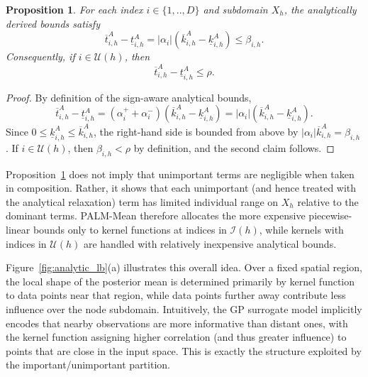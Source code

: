 \documentclass[pdflatex,sn-mathphys-num]{sn-jnl}%
\theoremstyle{thmstyleone}%
\newtheorem{proposition}[theorem]{Proposition}%
\theoremstyle{thmstyletwo}%
\theoremstyle{thmstylethree}%
\begin{document}
\begin{proposition}
\label{prop:analytic_gap_beta}
For each index $i \in \{1,..,D\}$ and subdomain $X_h$, the analytically derived bounds satisfy
\[
\overline{t}_{i,h}^{A}-\underline{t}_{i,h}^{A}
=
|\alpha_i|\left(\overline{k}_{i,h}^{A}-\underline{k}_{i,h}^{A}\right)
\le \beta_{i,h}.
\]
Consequently, if $i\in\mathcal{U}(h)$, then
\[
\overline{t}_{i,h}^{A}-\underline{t}_{i,h}^{A}
\le \rho.
\]
\end{proposition}

\begin{proof}
By definition of the sign-aware analytical bounds,
\[
\overline{t}_{i,h}^{A}-\underline{t}_{i,h}^{A}
=
(\alpha_i^++\alpha_i^-)\left(\overline{k}_{i,h}^{A}-\underline{k}_{i,h}^{A}\right)
=
|\alpha_i|\left(\overline{k}_{i,h}^{A}-\underline{k}_{i,h}^{A}\right).
\]
Since $0\le \underline{k}_{i,h}^{A}\le \overline{k}_{i,h}^{A}$, the right-hand side is bounded from above by $|\alpha_i|\overline{k}_{i,h}^{A}=\beta_{i,h}$. If $i\in\mathcal{U}(h)$, then $\beta_{i,h}<\rho$ by definition, and the second claim follows.
\end{proof}

Proposition~\ref{prop:analytic_gap_beta} does not imply that unimportant terms are negligible when taken in composition.  Rather, it shows that each unimportant (and hence treated with the analytical relaxation) term has limited individual range on $X_h$ relative to the dominant terms. PALM-Mean therefore allocates the more expensive piecewise-linear bounds only to kernel functions at indices in $\mathcal{I}(h)$, while kernels with indices in $\mathcal{U}(h)$ are handled with relatively inexpensive analytical bounds.

Figure~\ref{fig:analytic_lb}(a) illustrates this overall idea. Over a fixed spatial region, the local shape of the posterior mean is determined primarily by kernel function to data points near that region, while data points further away contribute less influence over the node subdomain. 
Intuitively, the GP surrogate model implicitly encodes that nearby observations are more informative than distant ones, with the kernel function assigning higher correlation (and thus greater influence) to points that are close in the input space. 
This is exactly the structure exploited by the important/unimportant partition.
\end{document}
